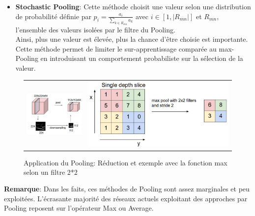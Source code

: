 \begin{itemize}
    \item \textbf{Stochastic Pooling}\cite{stopool}: Cette méthode choisit une valeur selon une distribution de probabilité définie par $p_i=\frac{a_{i}}{\sum_{k \in R_{mn}}a_k}$ avec $i \in [1, |R_{mn}|]$ et $R_{mn}$, l'ensemble des valeurs isolées par le filtre du Pooling.\\

    Ainsi, plus une valeur est élevée, plus la chance d'être choisie est importante. Cette méthode permet de limiter le sur-apprentissage comparée au max-Pooling en introduisant un comportement probabiliste sur la sélection de la valeur.\\
\end{itemize}
\begin{figure}
\begin{tabular}{cc}
    \includegraphics[scale=0.4]{./tex/convolution-network/cnn/pooling_ex.png}  & \includegraphics[scale=0.3]{./tex/convolution-network/cnn/maxpool.jpeg} \\
\end{tabular}
\caption{Application du Pooling: Réduction et exemple avec la fonction max selon un filtre 2*2}
\label{maxpool_fig}
\end{figure}

\noindent \textbf{Remarque}: Dans les faits, ces méthodes de Pooling sont assez marginales et peu exploitées. L'écrasante majorité des réseaux actuels exploitant des approches par Pooling reposent sur l'opérateur Max ou Average.\\

